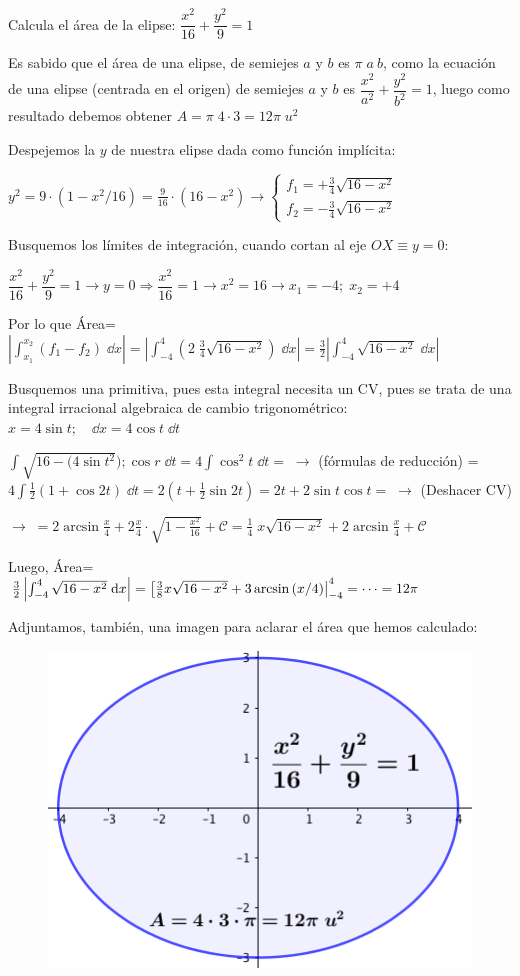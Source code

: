\begin{ejem}
Calcula el área de la elipse: $\dfrac{x^2}{16} + \dfrac {y^2}{9} =1$	

\textcolor{gris}{Es sabido que el área de una elipse, de semiejes $a$ y $b$ es $\pi\; a\: b$, como la ecuación de una elipse (centrada en el origen) de semiejes $a$ y $b$ es $\dfrac{x^2}{a^2}+\dfrac{y^2}{b^2}=1$, luego como resultado debemos obtener $A=\pi \; 4\cdot 3 = 12 \pi\; u^2$  }

Despejemos la $y$ de nuestra elipse dada como función implícita: 

$\displaystyle y^2=9\cdot \left(1-x^2/16 \right)=\frac 9 {16} \cdot (16-x^2) \to \begin{cases}
 f_1=+\frac 3 4 \sqrt{16-x^2}	\\
 f_2=-\frac 3 4 \sqrt{16-x^2}
 \end{cases}$
 
 Busquemos los límites de integración, cuando cortan al eje $OX \equiv y=0$:
 
$\dfrac{x^2}{16} + \dfrac {y^2}{9} =1 \to y=0 \Rightarrow \dfrac{x^2}{16}  =1 \to x^2=16 \to x_1=-4; \; x_2=+4 $ 

Por lo que Área= $\displaystyle \left| \int_{x_1}^{x_2}(f_1-f_2)\; \dd x \right|= \left| \int_{-4}^{4} \left( 2\;\frac 3 4 \sqrt{16-x^2} \right) \; \dd x \right|= \frac 3 2 \left| \int_{-4}^{4} \sqrt{16-x^2} \; \dd x \right|$

Busquemos una primitiva, pues esta integral necesita un CV, pues se trata de una integral irracional algebraica de cambio trigonométrico: $x=4 \sin t; \quad \dd x= 4 \cos t \; \dd t$

$\displaystyle \int \sqrt{16-(4 \sin t^2}); \cos r\; \dd t = 4 \int \cos^2 t\; \dd t = \; \to$ (fórmulas de reducción) = $\displaystyle 4 \int \frac 1 2 (1+\cos 2t)\; \dd t= 2 (t+\frac 1 2 \sin 2t)= 2t + 2 \sin t \cos t = \; \to$ (Deshacer CV) 

$\to \; = \displaystyle 2\arcsin \frac x 4 + 2 \frac x 4 \cdot  \sqrt{1-\frac {x^2}{16}}+\mathcal C= \frac 1 4\; x\sqrt{16-x^2}+2\arcsin \frac x 4 + \mathcal C$ 

Luego, Área= $\frac 3 2 \left| \int_{-4}^{4} \sqrt{16-x^2} \; \dd x \right| = \eval[\frac 3 8 x \sqrt{16-x^2}+3 \arcsin {(x/4)}|_{-4}^4= \cdots= 12\pi$

Adjuntamos, también,  una imagen para aclarar el área que hemos calculado:
\begin{figure}[H]
 		\centering
		\includegraphics[width=.45
		\textwidth]{imagenes/imagenes08/T08IM17.png}
	\end{figure}
\end{ejem}

